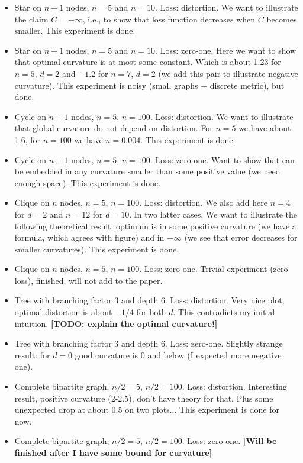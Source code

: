 \documentclass{article} %
\begin{document}
\begin{itemize}
    \item Star on $n+1$ nodes, $n = 5$ and $n = 10$. Loss: distortion. 
    We want to illustrate the claim $C = -\infty$, i.e., to show that loss function decreases when $C$ becomes smaller. This experiment is done. 
    \item Star on $n+1$ nodes, $n = 5$ and $n = 10$. Loss: zero-one. Here we want to show that optimal curvature is at most some constant. Which is about 1.23 for $n=5$, $d = 2$ and $-1.2$ for $n = 7$, $d = 2$ (we add this pair to illustrate negative curvature). This experiment is noisy (small graphs + discrete metric), but done. 
    \item Cycle on $n+1$ nodes, $n = 5$, $n = 100$. Loss: distortion. We want to illustrate that global curvature do not depend on distortion. For $n = 5$ we have about 1.6, for $n = 100$ we have $n = 0.004$. This experiment is done.
    \item Cycle on $n+1$ nodes, $n = 5$, $n = 100$. Loss: zero-one. Want to show that can be embedded in any curvature smaller than some positive value (we need enough space). This experiment is done.
    \item Clique on $n$ nodes, $n = 5$, $n = 100$. Loss: distortion. We also add here $n = 4$ for $d = 2$ and $n = 12$ for $d = 10$. In two latter cases, We want to illustrate the following theoretical result: optimum is in some positive curvature (we have a formula, which agrees with figure) and in $-\infty$ (we see that error decreases for smaller curvatures). This experiment is done.
   \item Clique on $n$ nodes, $n = 5$, $n = 100$. Loss: zero-one. Trivial experiment (zero loss), finished, will not add to the paper.
   \item Tree with branching factor $3$ and depth $6$. Loss: distortion. Very nice plot, optimal distortion is about $-1/4$ for both $d$. This contradicts my initial intuition. \textbf{[TODO: explain the optimal curvature!]}
   \item Tree with branching factor $3$ and depth $6$. Loss: zero-one. Slightly strange result: for $d = 0$ good curvature is 0 and below  (I expected more negative one). 
   \item Complete bipartite graph, $n/2 = 5$, $n/2 = 100$. Loss: distortion. Interesting result, positive curvature (2-2.5), don't have theory for that. Plus some unexpected drop at about 0.5 on two plots... This experiment is done for now. 
   \item Complete bipartite graph, $n/2 = 5$, $n/2 = 100$. Loss: zero-one. \textbf{[Will be finished after I have some bound for curvature]} 
\end{itemize}
\end{document}
